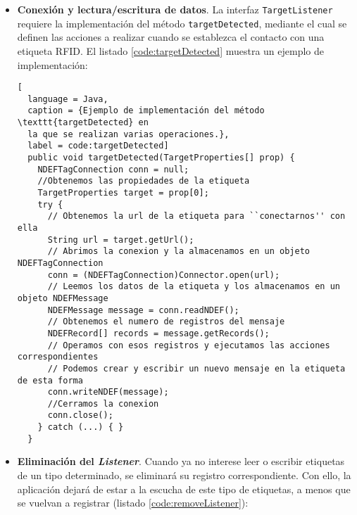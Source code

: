 \begin{itemize}
El listado \ref{code:addListener} muestra un ejemplo en el que se añaden
dos \emph{Listener}s:

\begin{lstlisting}[
  language = Java,
  caption = {Se añade un \emph{Listener} para etiquetas \texttt{NDEF} y otro
  para etiquetas \texttt{NDEF} del tipo ``app/mi\_tipo''.},
  label = code:addListener]
  try{
    DiscoveryManager.getInstance().addTargetListener(this, TargetType.NDEF_TAG);
    DiscoveryManager.getInstance().addNDEFRecordListener(this, new NDEFRecordType(NDEFRecordType.MIME, ``app/mi_tipo''));
  } catch(ContactlessException e) { }
\end{lstlisting}

\item \textbf{Conexión y lectura/escritura de datos}. La  interfaz
\texttt{TargetListener} requiere la implementación del método
\texttt{targetDetected}, mediante el cual se definen las acciones a realizar 
cuando se establezca el contacto con una etiqueta \acs{RFID}. El listado
\ref{code:targetDetected} muestra un ejemplo de implementación:

\begin{lstlisting}[
  language = Java,
  caption = {Ejemplo de implementación del método \texttt{targetDetected} en
  la que se realizan varias operaciones.},
  label = code:targetDetected]
  public void targetDetected(TargetProperties[] prop) {
    NDEFTagConnection conn = null;
    //Obtenemos las propiedades de la etiqueta
    TargetProperties target = prop[0];
    try {
      // Obtenemos la url de la etiqueta para ``conectarnos'' con ella
      String url = target.getUrl();
      // Abrimos la conexion y la almacenamos en un objeto NDEFTagConnection
      conn = (NDEFTagConnection)Connector.open(url);
      // Leemos los datos de la etiqueta y los almacenamos en un objeto NDEFMessage
      NDEFMessage message = conn.readNDEF();
      // Obtenemos el numero de registros del mensaje
      NDEFRecord[] records = message.getRecords();
      // Operamos con esos registros y ejecutamos las acciones correspondientes
      // Podemos crear y escribir un nuevo mensaje en la etiqueta de esta forma
      conn.writeNDEF(message);
      //Cerramos la conexion
      conn.close();
    } catch (...) { }
  }
\end{lstlisting}

\item \textbf{Eliminación del \emph{Listener}}. Cuando ya no interese leer o 
escribir etiquetas de un tipo determinado, se eliminará su registro 
correspondiente. Con ello, la aplicación dejará de estar a la escucha de este 
tipo de etiquetas, a menos que se vuelvan a registrar (listado
\ref{code:removeListener}):


\end{itemize}

